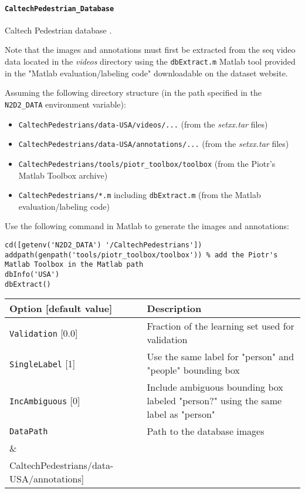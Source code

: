 \documentclass[a4paper,11pt,oneside]{article}
\newenvironment{myitemize}
{ \begin{itemize}
    \setlength{\itemsep}{0pt}
    \setlength{\parskip}{0pt}
    \setlength{\parsep}{0pt}     }
{ \end{itemize}                  }
\begin{document}
\paragraph{\texorpdfstring{\lstinline[basicstyle=\ttfamily\bfseries]!CaltechPedestrian_Database!}{CaltechPedestrian\_Database}}
Caltech Pedestrian database \citep{Dollar2009}.

Note that the images and annotations must first be extracted from the seq video
 data located in the \emph{videos} directory using the \lstinline!dbExtract.m!
 Matlab tool provided in the "Matlab evaluation/labeling code" downloadable on
 the dataset website.

Assuming the following directory structure (in the path specified in the \lstinline!N2D2_DATA! environment variable):
\begin{myitemize}
\item \lstinline!CaltechPedestrians/data-USA/videos/...!
(from the \emph{setxx.tar} files)
\item \lstinline!CaltechPedestrians/data-USA/annotations/...!
(from the \emph{setxx.tar} files)
\item \lstinline!CaltechPedestrians/tools/piotr_toolbox/toolbox!
(from the Piotr's Matlab Toolbox archive)
\item \lstinline!CaltechPedestrians/*.m! including \lstinline!dbExtract.m!
(from the Matlab evaluation/labeling code)
\end{myitemize}

Use the following command in Matlab to generate the images and annotations:
\begin{lstlisting}[style=matlab]
cd([getenv('N2D2_DATA') '/CaltechPedestrians'])
addpath(genpath('tools/piotr_toolbox/toolbox')) % add the Piotr's Matlab Toolbox in the Matlab path
dbInfo('USA')
dbExtract()
\end{lstlisting}

\begin{center}
 \begin{tabular}{| p{5cm} | p{10cm} | }
 \hline
 Option [default value] & Description\\
 \hline\hline
  \lstinline!Validation! [0.0] & Fraction of the learning set used for
  validation \\
  \lstinline!SingleLabel! [1] & Use the same label for "person" and "people"
  bounding box \\
  \lstinline!IncAmbiguous! [0] & Include ambiguous bounding box labeled
  "person?" using the same label as "person" \\
  \lstinline!DataPath! & Path to the database images \\
    & \\
  \lstinline!LabelPath! & Path to the database annotations \\
   \noindent [\lstinline!$N2D2_DATA!/ & \\
   \noindent CaltechPedestrians/data-USA/annotations] & \\
 \hline
\end{tabular}
\end{center}
\end{document}

